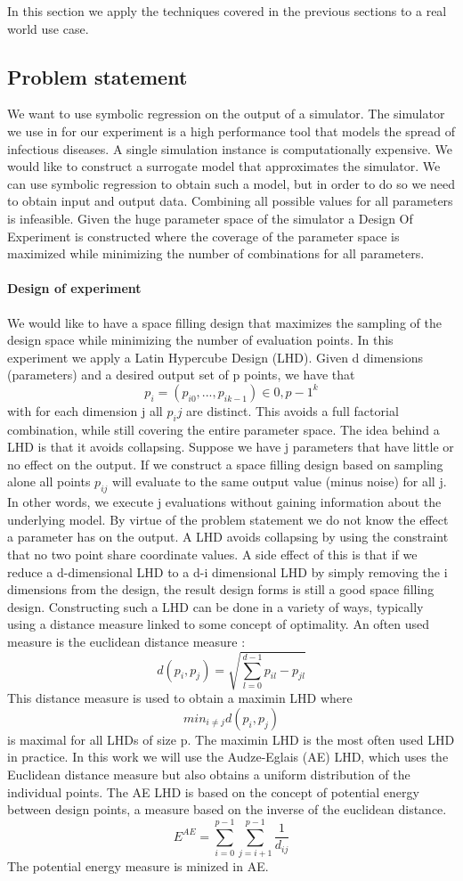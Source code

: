 In this section we apply the techniques covered in the previous sections to a real world use case.
\subsection{Problem statement}
We want to use symbolic regression on the output of a simulator. The simulator we use in for our experiment is a high performance tool \citep{stride} that models the spread of infectious diseases. A single simulation instance is computationally expensive. We would like to construct a surrogate model that approximates the simulator. We can use symbolic regression to obtain such a model, but in order to do so we need to obtain input and output data. Combining all possible values for all parameters is infeasible. 
Given the huge parameter space of the simulator a Design Of Experiment is constructed where the coverage of the parameter space is maximized while minimizing the number of combinations for all parameters. 
\paragraph{Design of experiment}
We would like to have a space filling design that maximizes the sampling of the design space while minimizing the number of evaluation points.
In this experiment we apply a Latin Hypercube Design (LHD). 
Given d dimensions (parameters) and a desired output set of p points, we have that 
\[
p_i = (p_{i0}, ..., p_{i k-1}) \in {0, p -1}^k
\]
with for each dimension j all $p_ij$ are distinct. This avoids a full factorial combination, while still covering the entire parameter space. 
The idea behind a LHD is that it avoids collapsing. Suppose we have j parameters that have little or no effect on the output. If we construct a space filling design based on sampling alone all points $p_{ij}$ will evaluate to the same output value (minus noise) for all j. In other words, we execute j evaluations without gaining information about the underlying model. By virtue of the problem statement we do not know the effect a parameter has on the output. A LHD avoids collapsing by using the constraint that no two point share coordinate values. A side effect of this is that if we reduce a d-dimensional LHD to a d-i dimensional LHD by simply removing the i dimensions from the design, the result design forms is still a good space filling design.
Constructing such a LHD can be done in a variety of ways, typically using a distance measure linked to some concept of optimality. An often used measure is the euclidean distance measure :
\[
d(p_i, p_j) = \sqrt{\sum_{l=0}^{d-1}{p_{il}-p_{jl}}}
\]
This distance measure is used to obtain a maximin LHD where
\[
min_{i \neq j} d(p_i,p_j)
\]
is maximal for all LHDs of size p. The maximin LHD is the most often used LHD in practice. In this work we will use the Audze-Eglais \citep{AudzeEglais, AudzeEglais2, AudzeEglais3} (AE) LHD, which uses the Euclidean distance measure but also obtains a uniform distribution of the individual points. 
The AE LHD is based on the concept of potential energy between design points, a measure based on the inverse of the euclidean distance.
\[
E^{AE} = \sum_{i=0}^{p-1} {\sum_{j=i+1}^{p-1} {\frac{1}{d_{ij}}}}
\]
The potential energy measure is minized in AE.
